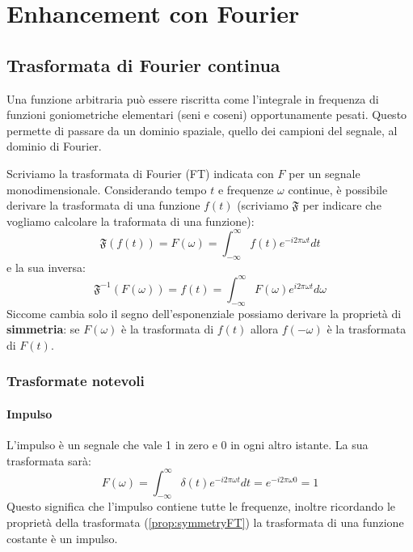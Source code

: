 \chapter{Enhancement con Fourier}
\section{Trasformata di Fourier continua}
Una funzione arbitraria può essere riscritta come l'integrale in frequenza di funzioni goniometriche elementari (seni e coseni) opportunamente pesati. Questo permette di passare da un dominio spaziale, quello dei campioni del segnale, al dominio di Fourier.

Scriviamo la trasformata di Fourier (FT) indicata con $F$ per un segnale monodimensionale. Considerando tempo $t$ e frequenze $\omega$ continue, è possibile derivare la trasformata di una funzione $f(t)$ (scriviamo $\mathfrak{F}$ per indicare che vogliamo calcolare la traformata di una funzione):
\begin{equation}
	\mathfrak{F}(f(t)) = F(\omega) = \int_{-\infty}^{\infty}f(t)e^{-i2\pi\omega t} dt
\end{equation}
e la sua inversa:
\begin{equation}
	\mathfrak{F}^{-1}(F(\omega)) = f(t) = \int_{-\infty}^{\infty} F(\omega)e^{i2\pi\omega t} d\omega
\end{equation}
Siccome cambia solo il segno dell'esponenziale possiamo derivare la proprietà di \textbf{simmetria}\label{prop:symmetryFT}: se $F(\omega)$ è la trasformata di $f(t)$ allora $f(-\omega)$ è la trasformata di $F(t)$.
\subsection{Trasformate notevoli}
\subsubsection{Impulso}
L'impulso è un segnale che vale 1 in zero e 0 in ogni altro istante. La sua trasformata sarà:
\begin{equation}
	F(\omega) = \int_{-\infty}^{\infty}\delta(t)e^{-i2\pi\omega t} dt = e^{-i2\pi\omega 0} = 1
\end{equation}
Questo significa che l'impulso contiene tutte le frequenze, inoltre ricordando le proprietà della trasformata (\ref{prop:symmetryFT}) la trasformata di una funzione costante è un impulso.

